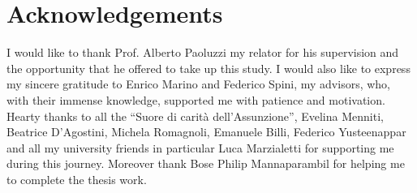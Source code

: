 \chapter{Acknowledgements}
\label{cha:acknowledgements}
I would like to thank Prof. Alberto Paoluzzi my relator for his supervision and the opportunity that he offered to take up this study. I would also like to express my sincere gratitude to Enrico Marino and Federico Spini, my advisors, who, with their immense knowledge, supported me with patience and  motivation.
\newline
Hearty thanks to all the “Suore di carità dell'Assunzione”, Evelina Menniti, Beatrice D'Agostini, Michela Romagnoli, Emanuele Billi, Federico Yusteenappar and all my university friends in particular Luca Marzialetti for supporting me during this journey.
\newline
Moreover thank Bose Philip Mannaparambil for helping me to complete the thesis work.